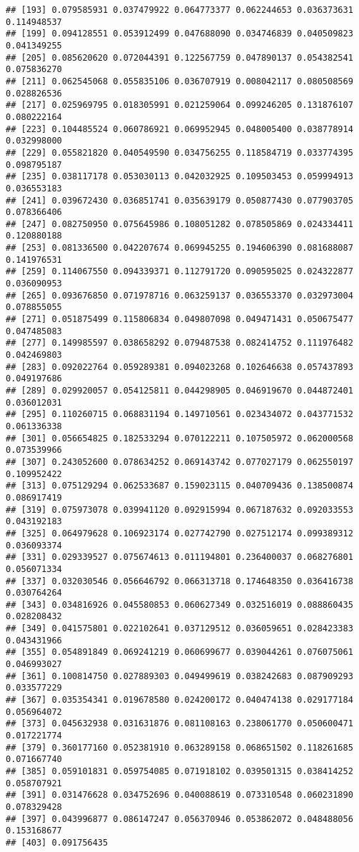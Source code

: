 \documentclass[
]{article}
\begin{document}
\begin{verbatim}
## [193] 0.079585931 0.037479922 0.064773377 0.062244653 0.036373631 0.114948537
## [199] 0.094128551 0.053912499 0.047688090 0.034746839 0.040509823 0.041349255
## [205] 0.085620620 0.072044391 0.122567759 0.047890137 0.054382541 0.075836270
## [211] 0.062545068 0.055835106 0.036707919 0.008042117 0.080508569 0.028826536
## [217] 0.025969795 0.018305991 0.021259064 0.099246205 0.131876107 0.080222164
## [223] 0.104485524 0.060786921 0.069952945 0.048005400 0.038778914 0.032998000
## [229] 0.055821820 0.040549590 0.034756255 0.118584719 0.033774395 0.098795187
## [235] 0.038117178 0.053030113 0.042032925 0.109503453 0.059994913 0.036553183
## [241] 0.039672430 0.036851741 0.035639179 0.050877430 0.077903705 0.078366406
## [247] 0.082750950 0.075645986 0.108051282 0.078505869 0.024334411 0.120880188
## [253] 0.081336500 0.042207674 0.069945255 0.194606390 0.081688087 0.141976531
## [259] 0.114067550 0.094339371 0.112791720 0.090595025 0.024322877 0.036090953
## [265] 0.093676850 0.071978716 0.063259137 0.036553370 0.032973004 0.078855055
## [271] 0.051875499 0.115806834 0.049807098 0.049471431 0.050675477 0.047485083
## [277] 0.149985597 0.038658292 0.079487538 0.082414752 0.111976482 0.042469803
## [283] 0.092022764 0.059289381 0.094023268 0.102646638 0.057437893 0.049197686
## [289] 0.029920057 0.054125811 0.044298905 0.046919670 0.044872401 0.036012031
## [295] 0.110260715 0.068831194 0.149710561 0.023434072 0.043771532 0.061336338
## [301] 0.056654825 0.182533294 0.070122211 0.107505972 0.062000568 0.073539966
## [307] 0.243052600 0.078634252 0.069143742 0.077027179 0.062550197 0.109952422
## [313] 0.075129294 0.062533687 0.159023115 0.040709436 0.138500874 0.086917419
## [319] 0.075973078 0.039941120 0.092915994 0.067187632 0.092033553 0.043192183
## [325] 0.064979628 0.106923174 0.027742790 0.027512174 0.099389312 0.036093374
## [331] 0.029339527 0.075674613 0.011194801 0.236400037 0.068276801 0.056071334
## [337] 0.032030546 0.056646792 0.066313718 0.174648350 0.036416738 0.030764264
## [343] 0.034816926 0.045580853 0.060627349 0.032516019 0.088860435 0.028208432
## [349] 0.041575801 0.022102641 0.037129512 0.036059651 0.028423383 0.043431966
## [355] 0.054891849 0.069241219 0.060699677 0.039044261 0.076075061 0.046993027
## [361] 0.100814750 0.027889303 0.049499619 0.038242683 0.087909293 0.033577229
## [367] 0.035354341 0.019678580 0.024200172 0.040474138 0.029177184 0.056964072
## [373] 0.045632938 0.031631876 0.081108163 0.238061770 0.050600471 0.017221774
## [379] 0.360177160 0.052381910 0.063289158 0.068651502 0.118261685 0.071667740
## [385] 0.059101831 0.059754085 0.071918102 0.039501315 0.038414252 0.058707921
## [391] 0.031476628 0.034752696 0.040088619 0.073310548 0.060231890 0.078329428
## [397] 0.043996877 0.086147247 0.056370946 0.053862072 0.048488056 0.153168677
## [403] 0.091756435
\end{verbatim}
\end{document}

